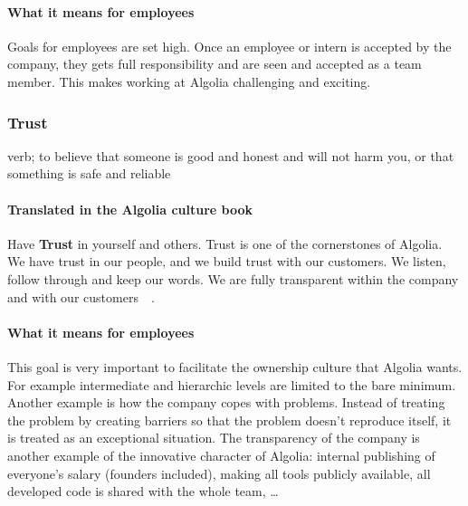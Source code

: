 \paragraph{What it means for employees} 

Goals for employees are set high. Once an employee or intern is accepted by the company, they gets full responsibility and are seen and accepted as a team member. This makes working at Algolia challenging and exciting.

\subsubsection{Trust}
\label{ssub:trust}

\begin{definition}
verb; to believe that someone is good and honest and will not harm you, or that something is safe and reliable
\end{definition}


\paragraph{Translated in the Algolia culture book}

Have \textbf{Trust} in yourself and others. Trust is one of the cornerstones of Algolia. We have trust in our people, and we build trust with our customers. We listen, follow through and keep our words. We are fully transparent within the company and with our customers~\cite{algolia-careers}~.

\paragraph{What it means for employees}

This goal is very important to facilitate the ownership culture that Algolia wants. For example intermediate and hierarchic levels are limited to the bare minimum. Another example is how the company copes with problems. Instead of treating the problem by creating barriers so that the problem doesn't reproduce itself, it is treated as an exceptional situation. The transparency of the company is another example of the innovative character of Algolia: internal publishing of everyone's salary (founders included), making all tools publicly available, all developed code is shared with the whole team, \dots

